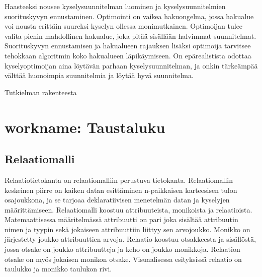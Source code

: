 \documentclass[finnish]{tktltiki2}
\theoremstyle{definition}
\theoremstyle{remark}
\begin{document}
Haasteeksi nousee kyselysuunnitelman luominen ja kyselysuunnitelmien suorituskyvyn ennustaminen. Optimointi on vaikea hakuongelma, jossa hakualue voi nousta erittäin suureksi kyselyn ollessa monimutkainen. \cite{chaudhuri1998} Optimoijan tulee valita pienin mahdollinen hakualue, joka pitää sisällään halvimmat suunnitelmat. Suorituskyvyn ennustamisen ja hakualueen rajauksen lisäksi optimoija tarvitsee tehokkaan algoritmin koko hakualueen läpikäymiseen. On epärealistista odottaa kyselyoptimoijan aina löytävän parhaan kyselysuunnitelman, ja onkin tärkeämpää välttää huonoimpia suunnitelmia ja löytää hyvä suunnitelma. \cite{ramakrishnan2003database}

Tutkielman rakenteesta

%
%



\section{workname: Taustaluku}
\subsection{Relaatiomalli}

Relaatiotietokanta on relaatiomalliin perustuva tietokanta. Relaatiomallin keskeinen piirre on kaiken datan esittäminen n-paikkaisen karteesisen tulon osajoukkona, ja se tarjoaa deklaratiivisen menetelmän datan ja kyselyjen määrittämiseen. Relaatiomalli koostuu attribuuteista, monikoista ja relaatioista. Matemaattisessa määritelmässä attribuutti on pari joka sisältää attribuutin nimen ja tyypin sekä jokaiseen attribuuttiin liittyy sen arvojoukko. Monikko on järjestetty joukko attribuuttien arvoja. Relaatio koostuu otsakkeesta ja sisällöstä, jossa otsake on joukko attribuutteja ja keho on joukko monikkoja. Relaation otsake on myös jokaisen monikon otsake. Visuaalisessa esityksissä relaatio on taulukko ja monikko taulukon rivi. 
\end{document}
